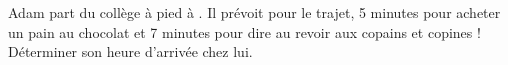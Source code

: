 \begin{exercice*}
   Adam part du collège à pied à . Il prévoit  pour le trajet, 5 minutes pour acheter un pain au chocolat et 7 minutes pour dire au revoir aux copains et copines ! \\
   Déterminer son heure d'arrivée chez lui.
\end{exercice*}